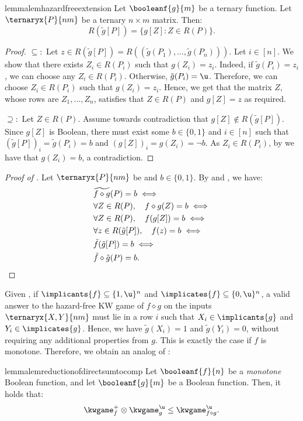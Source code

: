 \documentclass[acmsmall, nonacm, authorversion]{acmart}
\begin{document}
\begin{restatable}{lemma}{lemhazardfreeextension}\label{lem:hazard-free-extension-composition-aux}
Let $\booleanf{g}{m}$ be a ternary function. Let $\ternaryx{P}{nm}$ be a ternary $n\times m$ matrix. Then:
\[
R(\tilde{g}[P])=\{g[Z]: Z\in R(P)\}.
\]    
\end{restatable}
\begin{proof}
$\subseteq:$ Let $z\in R(\tilde{g}[P])=R((\tilde{g}(P_1),\dots,\tilde{g}(P_n)))$. Let $i\in [n]$. We show that there exists $Z_i\in R(P_i)$ such that $g(Z_i)=z_i$. Indeed, if $\tilde{g}(P_i)=z_i$, we can choose any $Z_i\in R(P_i)$.
Otherwise, $\tilde{g}(P_i)=\u$. Therefore, we can choose $Z_i\in R(P_i)$ such that $g(Z_i)=z_i$.
Hence, we get that the matrix $Z$, whose rows are $Z_1,\dots,Z_n$, satisfies that $Z\in R(P)$ and $g[Z]=z$ as required.

$\supseteq:$ Let $Z\in R(P)$. Assume towards contradiction that $g[Z]\not\in R(\tilde{g}[P])$. Since $g[Z]$ is Boolean, there must exist some $b\in \{0,1\}$ and $i\in [n]$ such that $(\tilde{g}[P])_i=\tilde{g}(P_i)=b$ and $(g[Z])_i=g(Z_i)=\neg b$. As $Z_i\in R(P_i)$, by  we have that $g(Z_i)=b$, a contradiction.
\end{proof}

\begin{proof}[Proof of ]
Let $\ternaryx{P}{nm}$ be and $b\in \{0,1\}$. By  and , we have:
\begin{align*}
&\widetilde{f\diamond g}(P)=b \iff \\
    &\forall Z\in R(P), \quad f\diamond g(Z)=b \iff \\
    &\forall Z\in R(P), \quad f(g[Z])=b \iff \\
    &\forall z\in R(\tilde{g}[P]), \quad f(z)=b \iff \\ 
    &\tilde{f}(\tilde{g}[P])=b \iff \\
    &\tilde{f}\diamond \tilde{g}(P)=b. \qedhere
\end{align*}
\end{proof}

Given , if $\implicants{f} \subseteq \{1,\u\}^n$ and $\implicates{f} \subseteq \{0,\u\}^n$, a valid answer to the hazard-free KW game of $f\diamond g$ on the inputs $\ternaryx{X,Y}{n m}$ must lie in a row $i$ such that $X_i\in \implicants{g}$ and $Y_i \in \implicates{g}$. Hence, we have $\tilde{g}(X_i)=1$ and $\tilde{g}(Y_i)=0$, without requiring any additional properties from $g$. 
This is exactly the case if $f$ is monotone. Therefore, we obtain an analog of \cite[Lemma 4]{KRW95}:
\begin{restatable}{lemma}{lemreductionofdirectsumtocomp}\label{lemma:reduction-of-direct-sum-to-comp}
    Let $\booleanf{f}{n}$ be a \emph{monotone} Boolean function, and let $\booleanf{g}{m}$ be a Boolean function. Then, it holds that:
    \[
    \kwgame_{f}^{+} \otimes \kwgame_{g}^{\u}\le \kwgame_{f\diamond g}^\u.
    \]
\end{restatable}
\end{document}
